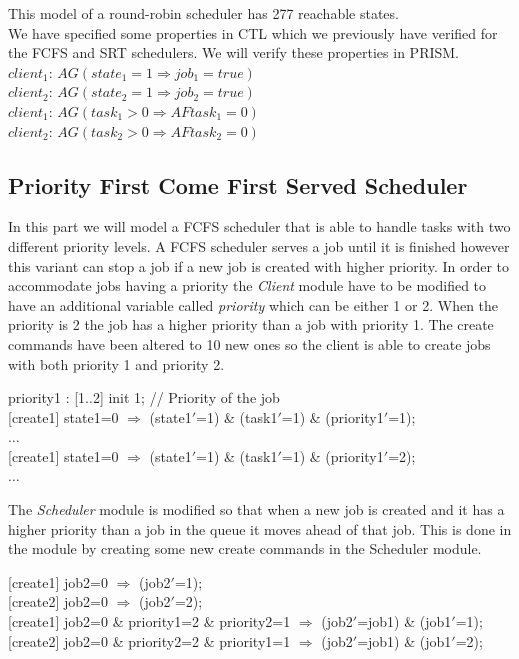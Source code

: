 \documentclass[12pt]{report}
\begin{document}
This model of a round-robin scheduler has 277 reachable states.\\
We have specified some properties in CTL which we previously have verified for the FCFS and SRT schedulers. We will verify these properties in PRISM.\\
$client_1$: $AG (state_1 = 1 \Rightarrow job_1 = true)$\\
$client_2$: $AG (state_2 = 1 \Rightarrow job_2 = true)$\\
$client_1$: $AG(task_1>0 \Rightarrow AF task_1 = 0)$ \\
$client_2$: $AG(task_2>0 \Rightarrow AF task_2 = 0)$ \\

\subsection*{Priority First Come First Served Scheduler}
In this part we will model a FCFS scheduler that is able to handle tasks with two different priority levels. A FCFS scheduler serves a job until it is finished however this variant can stop a job if a new job is created with higher priority. In order to accommodate jobs having a priority the \emph{Client} module have to be modified to have an additional variable called \emph{priority} which can be either 1 or 2. When the priority is 2 the job has a higher priority than a job with priority 1. The create commands have been altered to 10 new ones so the client is able to create jobs with both priority 1 and priority 2.
\begin{center}
priority1 : [1..2] init 1; // Priority of the job\\
{[create1]} state1=0 $\Rightarrow$ (state1$'$=1) \& (task1$'$=1) \& (priority1$'$=1);\\
$\dots$\\
{[create1]} state1=0 $\Rightarrow$ (state1$'$=1) \& (task1$'$=1) \& (priority1$'$=2);\\
$\dots$
\end{center}
The \emph{Scheduler} module is modified so that when a new job is created and it has a higher priority than a job in the queue it moves ahead of that job. This is done in the module by creating some new create commands in the Scheduler module.
\begin{center}
{[create1]} job2=0 $\Rightarrow$ (job2$'$=1);\\
{[create2]} job2=0 $\Rightarrow$ (job2$'$=2);\\
{[create1]} job2=0 \& priority1=2 \& priority2=1 $\Rightarrow$ (job2$'$=job1) \& (job1$'$=1);\\
{[create2]} job2=0 \& priority2=2 \& priority1=1 $\Rightarrow$ (job2$'$=job1) \& (job1$'$=2);
\end{center}
\end{document}
